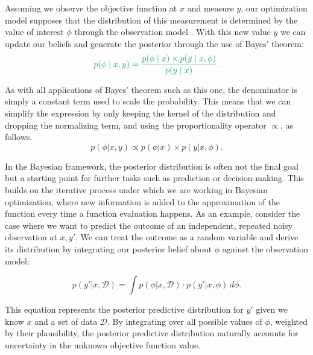 Assuming we observe the objective function at $x$ and measure $y$, our optimization model supposes that the distribution of this measurement is determined by the value of interest $\phi$ through the observation model . With this new value $y$ we can update our beliefs and generate the posterior  through the use of Bayes' theorem:
\[ \green{p(\phi \mid x, y) = \frac{p(\phi \mid x) \times p(y \mid x, \phi)}{p(y \mid x)}.} \]

As with all applications of Bayes' theorem such as this one, the denominator is simply a constant term used to scale the probability. This means that we can simplify the expression by only keeping the kernel of the distribution and dropping the normalizing term, and using the proportionality operator $\propto$, as follows. 
\[ p(\phi | x, y) \propto p(\phi | x) \times p(y | x, \phi). \] 

In the Bayesian framework, the posterior distribution is often not the final goal but a starting point for further tasks such as prediction or decision-making. This builds on the iterative process under which we are working in Bayesian optimization, where new information is added to the approximation of the function every time a function evaluation happens. As an example, consider the case where we want to predict the outcome of an independent, repeated noisy observation at $x, y'$. We can treat the outcome as a random variable and derive its distribution by integrating our posterior belief about $\phi$ against the observation model:

\[ p(y' | x, \mathcal{D}) = \int p(\phi | x, \mathcal{D}) \cdot p\left(y' | x, \phi\right) \, d \phi. \]

This equation represents the posterior predictive distribution for $y'$ given we know $x$ and a set of data $\mathcal{D}$. By integrating over all possible values of $\phi$, weighted by their plausibility, the posterior predictive distribution naturally accounts for uncertainty in the unknown objective function value.


